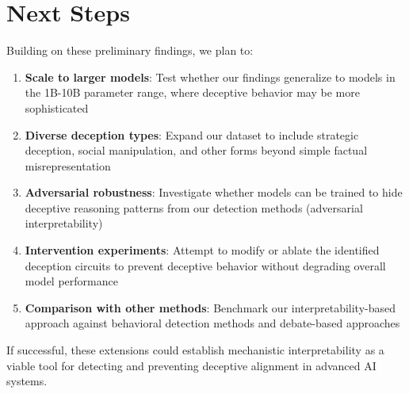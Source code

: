 \documentclass[midterm]{sparreport}
\begin{document}
\section{Next Steps}

Building on these preliminary findings, we plan to:

\begin{enumerate}
  \item \textbf{Scale to larger models}: Test whether our findings generalize to models in the 1B-10B parameter range, where deceptive behavior may be more sophisticated

  \item \textbf{Diverse deception types}: Expand our dataset to include strategic deception, social manipulation, and other forms beyond simple factual misrepresentation

  \item \textbf{Adversarial robustness}: Investigate whether models can be trained to hide deceptive reasoning patterns from our detection methods (adversarial interpretability)

  \item \textbf{Intervention experiments}: Attempt to modify or ablate the identified deception circuits to prevent deceptive behavior without degrading overall model performance

  \item \textbf{Comparison with other methods}: Benchmark our interpretability-based approach against behavioral detection methods and debate-based approaches~\cite{irving2018ai}
\end{enumerate}

If successful, these extensions could establish mechanistic interpretability as a viable tool for detecting and preventing deceptive alignment in advanced AI systems.



\end{document}
